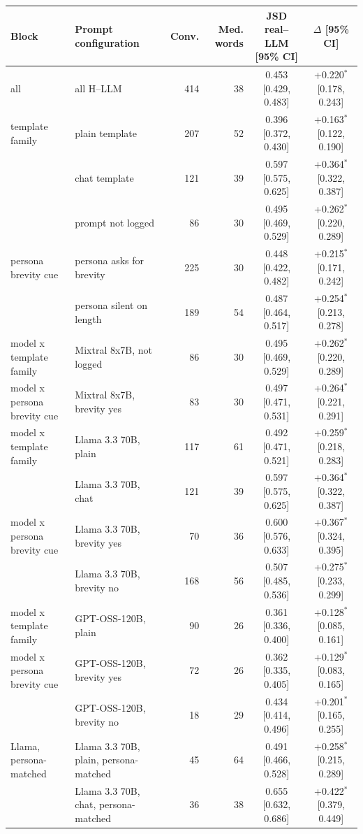 \begin{tabular}{llrrcc}
\toprule
Block & Prompt configuration & Conv. & Med. words & JSD real--LLM [95\% CI] & $\Delta$ [95\% CI] \\
\midrule
all & all H--LLM & 414 & 38 & 0.453 [0.429, 0.483] & +0.220$^{*}$ [0.178, 0.243] \\
\addlinespace
template family & plain template & 207 & 52 & 0.396 [0.372, 0.430] & +0.163$^{*}$ [0.122, 0.190] \\
 & chat template & 121 & 39 & 0.597 [0.575, 0.625] & +0.364$^{*}$ [0.322, 0.387] \\
 & prompt not logged & 86 & 30 & 0.495 [0.469, 0.529] & +0.262$^{*}$ [0.220, 0.289] \\
\addlinespace
persona brevity cue & persona asks for brevity & 225 & 30 & 0.448 [0.422, 0.482] & +0.215$^{*}$ [0.171, 0.242] \\
 & persona silent on length & 189 & 54 & 0.487 [0.464, 0.517] & +0.254$^{*}$ [0.213, 0.278] \\
\addlinespace
model x template family & Mixtral 8x7B, not logged & 86 & 30 & 0.495 [0.469, 0.529] & +0.262$^{*}$ [0.220, 0.289] \\
\addlinespace
model x persona brevity cue & Mixtral 8x7B, brevity yes & 83 & 30 & 0.497 [0.471, 0.531] & +0.264$^{*}$ [0.221, 0.291] \\
\addlinespace
model x template family & Llama 3.3 70B, plain & 117 & 61 & 0.492 [0.471, 0.521] & +0.259$^{*}$ [0.218, 0.283] \\
 & Llama 3.3 70B, chat & 121 & 39 & 0.597 [0.575, 0.625] & +0.364$^{*}$ [0.322, 0.387] \\
\addlinespace
model x persona brevity cue & Llama 3.3 70B, brevity yes & 70 & 36 & 0.600 [0.576, 0.633] & +0.367$^{*}$ [0.324, 0.395] \\
 & Llama 3.3 70B, brevity no & 168 & 56 & 0.507 [0.485, 0.536] & +0.275$^{*}$ [0.233, 0.299] \\
\addlinespace
model x template family & GPT-OSS-120B, plain & 90 & 26 & 0.361 [0.336, 0.400] & +0.128$^{*}$ [0.085, 0.161] \\
\addlinespace
model x persona brevity cue & GPT-OSS-120B, brevity yes & 72 & 26 & 0.362 [0.335, 0.405] & +0.129$^{*}$ [0.083, 0.165] \\
 & GPT-OSS-120B, brevity no & 18 & 29 & 0.434 [0.414, 0.496] & +0.201$^{*}$ [0.165, 0.255] \\
\addlinespace
Llama, persona-matched & Llama 3.3 70B, plain, persona-matched & 45 & 64 & 0.491 [0.466, 0.528] & +0.258$^{*}$ [0.215, 0.289] \\
 & Llama 3.3 70B, chat, persona-matched & 36 & 38 & 0.655 [0.632, 0.686] & +0.422$^{*}$ [0.379, 0.449] \\
\bottomrule
\end{tabular}
